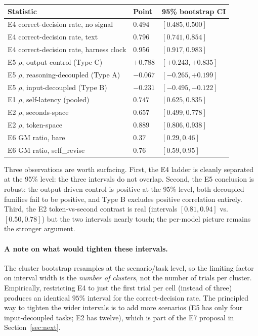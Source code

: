 \documentclass[11pt]{article}
\begin{document}
\begin{center}
\begin{tabular}{@{}lll@{}}
\toprule
Statistic & Point & 95\% bootstrap CI \\
\midrule
E4 correct-decision rate, no signal     & 0.494 & $[0.485, 0.500]$ \\
E4 correct-decision rate, text          & 0.796 & $[0.741, 0.854]$ \\
E4 correct-decision rate, harness clock & 0.956 & $[0.917, 0.983]$ \\
E5 $\rho$, output control (Type C)      & $+0.788$ & $[+0.243, +0.835]$ \\
E5 $\rho$, reasoning-decoupled (Type A) & $-0.067$ & $[-0.265, +0.199]$ \\
E5 $\rho$, input-decoupled (Type B)     & $-0.231$ & $[-0.495, -0.122]$ \\
E1 $\rho$, self-latency (pooled)        & $0.747$ & $[0.625, 0.835]$ \\
E2 $\rho$, seconds-space                & $0.657$ & $[0.499, 0.778]$ \\
E2 $\rho$, token-space                  & $0.889$ & $[0.806, 0.938]$ \\
E6 GM ratio, bare                       & $0.37$ & $[0.29, 0.46]$ \\
E6 GM ratio, self\_revise               & $0.76$ & $[0.59, 0.95]$ \\
\bottomrule
\end{tabular}
\end{center}

Three observations are worth surfacing. First, the E4 ladder is cleanly separated at the 95\%
level: the three intervals do not overlap. Second, the E5 conclusion is robust: the
output-driven control is positive at the 95\% level, both decoupled families fail to be
positive, and Type B excludes positive correlation entirely. Third, the E2 token-vs-second
contrast is real (intervals $[0.81, 0.94]$ vs.\ $[0.50, 0.78]$) but the two intervals nearly
touch; the per-model picture remains the stronger argument.

\paragraph{A note on what would tighten these intervals.} The cluster bootstrap resamples at
the scenario/task level, so the limiting factor on interval width is the \emph{number of
clusters}, not the number of trials per cluster. Empirically, restricting E4 to just the
first trial per cell (instead of three) produces an identical $95\%$ interval for the
correct-decision rate. The principled way to tighten the wider intervals is to add more
scenarios (E5 has only four input-decoupled tasks; E2 has twelve), which is part of the E7
proposal in Section~\ref{sec:next}.
\end{document}
